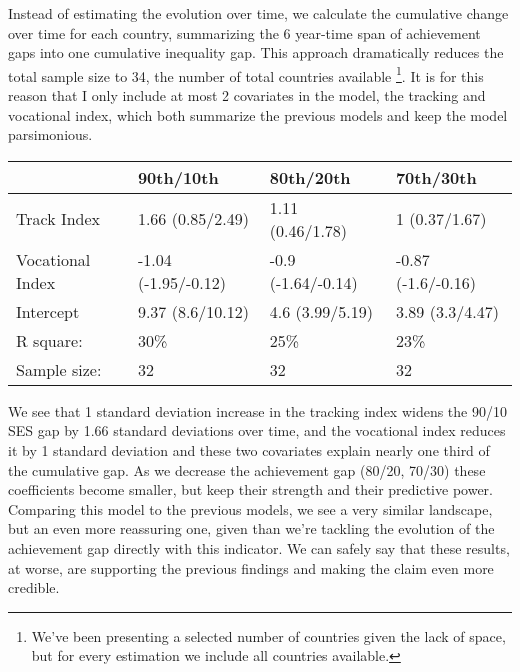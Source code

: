\documentclass[11pt, a4paper]{article}\usepackage[]{graphicx}\usepackage[]{color}
\begin{document}
Instead of estimating the evolution over time, we calculate the cumulative change over time for each country, summarizing the 6 year-time span of achievement gaps into one cumulative inequality gap. This approach dramatically reduces the total sample size to 34, the number of total countries available \footnote{We've been presenting a selected number of countries given the lack of space, but for every estimation we include all countries available.}. It is for this reason that I only include at most 2 covariates in the model, the tracking and vocational index, which both summarize the previous models and keep the model parsimonious.



\begin{table}[ht]
\centering
\begin{tabular}{llll}
  \hline
  & 90th/10th & 80th/20th & 70th/30th \\ 
  \hline
Track Index & 1.66 (0.85/2.49) & 1.11 (0.46/1.78) & 1 (0.37/1.67) \\ 
  Vocational Index & -1.04 (-1.95/-0.12) & -0.9 (-1.64/-0.14) & -0.87 (-1.6/-0.16) \\ 
  Intercept & 9.37 (8.6/10.12) & 4.6 (3.99/5.19) & 3.89 (3.3/4.47) \\ 
   \hline R square: & 30\% & 25\% & 23\% \\ Sample size: & 32 & 32 & 32 \\ \hline \hline
\end{tabular}
\end{table}


We see that 1 standard deviation increase in the tracking index widens the 90/10 SES gap by 1.66 standard deviations over time, and the vocational index reduces it by 1 standard deviation and these two covariates explain nearly one third of the cumulative gap. As we decrease the achievement gap (80/20, 70/30) these coefficients become smaller, but keep their strength and their predictive power. Comparing this model to the previous models, we see a very similar landscape, but an even more reassuring one, given than we're tackling the evolution of the achievement gap directly with this indicator. We can safely say that these results, at worse, are supporting the previous findings and making the claim even more credible.





\pagebreak
\end{document}
